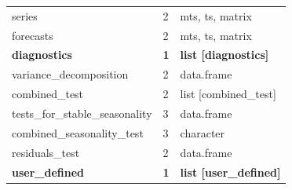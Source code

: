 \documentclass[article]{jss}
\begin{document}
\begin{longtable}[t]{lll}
\addlinespace
\hspace{2em}series & 2 & mts, ts, matrix\\
\hspace{2em}forecasts & 2 & mts, ts, matrix\\
\textbf{\hspace{1em}diagnostics} & \textbf{1} & \textbf{list [diagnostics]}\\
\hspace{2em}variance\_decomposition & 2 & data.frame\\
\hspace{2em}combined\_test & 2 & list [combined\_test]\\
\addlinespace
\hspace{3em}tests\_for\_stable\_seasonality & 3 & data.frame\\
\hspace{3em}combined\_seasonality\_test & 3 & character\\
\hspace{2em}residuals\_test & 2 & data.frame\\
\textbf{\hspace{1em}user\_defined} & \textbf{1} & \textbf{list [user\_defined]}\\
\bottomrule
\end{longtable}
\end{document}
